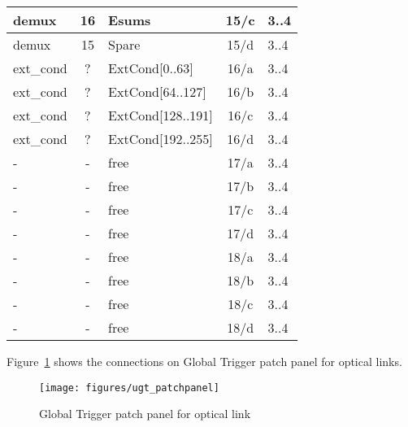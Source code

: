 \begin{longtable}{|l|c|l|c|l|}
demux & 16  & Esums      & 15/c & 3..4 \\\hline
demux & 15  & Spare      & 15/d & 3..4 \\\hline
ext\_cond & ?   & ExtCond[0..63]    & 16/a & 3..4 \\\hline
ext\_cond & ?   & ExtCond[64..127]  & 16/b & 3..4 \\\hline
ext\_cond & ?   & ExtCond[128..191] & 16/c & 3..4 \\\hline
ext\_cond & ?   & ExtCond[192..255] & 16/d & 3..4 \\\hline
- & - & free & 17/a & 3..4 \\\hline
- & - & free & 17/b & 3..4 \\\hline
- & - & free & 17/c & 3..4 \\\hline
- & - & free & 17/d & 3..4 \\\hline
- & - & free & 18/a & 3..4 \\\hline
- & - & free & 18/b & 3..4 \\\hline
- & - & free & 18/c & 3..4 \\\hline
- & - & free & 18/d & 3..4 \\\hline
\end{longtable}

Figure~\ref{fig:app:ugt_pp} shows the connections on Global Trigger patch panel for optical links.

\begin{figure}[htb]
\centering
\texttt{[image: figures/ugt\_patchpanel]}
\caption{Global Trigger patch panel for optical link}
\label{fig:app:ugt_pp}
\end{figure}

\clearpage

